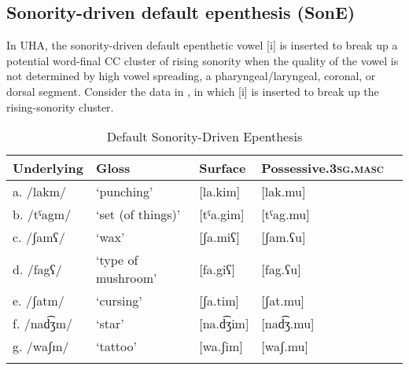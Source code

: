 \documentclass[output=paper,colorlinks,citecolor=brown]{langscibook}
\begin{document}
\subsection{Sonority-driven default epenthesis (SonE)} 
In UHA, the sonority-driven default epenthetic vowel [i] is inserted to break up a potential word-final CC cluster of rising sonority when the quality of the vowel  is not determined by high vowel spreading, a pharyngeal/laryngeal, coronal,  or dorsal segment. Consider the data in , in which [i] is inserted to break up the rising-sonority cluster.


\begin{table}
\caption{Default Sonority-Driven Epenthesis}
\label{table:defson}
\begin{tabular}{lllll}
\lsptoprule
Underlying & Gloss & Surface & Possessive.3\textsc{sg}.\textsc{masc} \\ \midrule
a. /lakm/   &   ‘punching’          &	[la.kim]    & [lak.mu]  \\
b. /tˤagm/  &	‘set (of things)’   &	[tˤa.gim]   & [tˤag.mu] \\
c. /ʃamʕ/   &	‘wax’               &	[ʃa.miʕ]	& [ʃam.ʕu]   \\
d. /fagʕ/	&   ‘type of mushroom’  &	[fa.giʕ]    & [fag.ʕu] \\
e. /ʃatm/	&   ‘cursing’	        &   [ʃa.tim]    & [ʃat.mu] \\
f. /nad͡ʒm/	&   ‘star’	            &   [na.d͡ʒim]   & [nad͡ʒ.mu] \\
g. /waʃm/	&   ‘tattoo’	        &    [wa.ʃim]    &	[waʃ.mu] \\
\lspbottomrule
\end{tabular}
\end{table}
\end{document}
